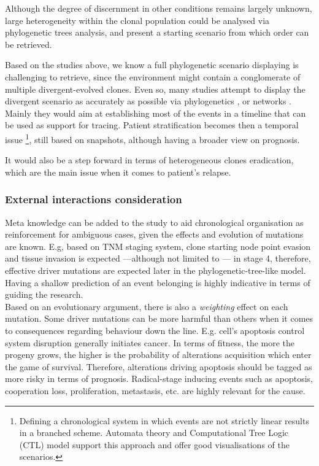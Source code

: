 Although the degree of discernment in other conditions remains largely unknown, large heterogeneity within the clonal population could be analysed via phylogenetic trees analysis, and present a starting scenario from which order can be retrieved.

Based on the studies above, we know a full phylogenetic scenario displaying is challenging to retrieve, since the environment might contain a conglomerate of multiple divergent-evolved clones. Even so, many studies attempt to display the divergent scenario as accurately as possible  via phylogenetics \cite{Beerenwinkel2005Mtreemix:Trees} \cite{Rahnenfuhrer2005EstimatingScores}, or networks \cite{Hjelm2006NewOncogenesis} \cite{Gerstung2011TheTumorigenesis}. Mainly they would aim at establishing most of the events in a timeline that can be used as support for tracing. Patient stratification becomes then a temporal issue \footnote{Defining a chronological system in which events are not strictly linear results in a branched scheme. Automata theory and Computational Tree Logic (CTL) model support this approach and offer good visualisations of the scenarios.}, still based on snapshots, although having a broader view on prognosis.

It would also be a step forward in terms of heterogeneous clones eradication, which are the main issue when it comes to patient's relapse.

\subsubsection{External interactions consideration}
Meta knowledge can be added to the study to aid chronological organisation as reinforcement for ambiguous cases, given the effects and evolution of mutations are known. E.g, based on TNM staging system, clone starting node point evasion and tissue invasion is expected —although not limited to \cite{Turajlic2016MetastasisProcess}— in stage 4, therefore, effective driver mutations are expected later in the phylogenetic-tree-like model. Having a shallow prediction of an event belonging is highly indicative in terms of guiding the research.
\\

Based on an evolutionary argument, there is also a \emph{weighting} effect on each mutation. Some driver mutations can be more harmful than others when it comes to consequences regarding behaviour down the line. E.g. cell's apoptosis control system disruption generally initiates cancer. In terms of fitness, the more the progeny grows, the higher is the probability of alterations acquisition which enter the game of survival\cite{Gerstung2011TheTumorigenesis}. Therefore, alterations driving apoptosis should be tagged as more risky in terms of prognosis. Radical-stage inducing events such as apoptosis, cooperation loss, proliferation, metastasis, etc. are highly relevant for the cause.
\\


